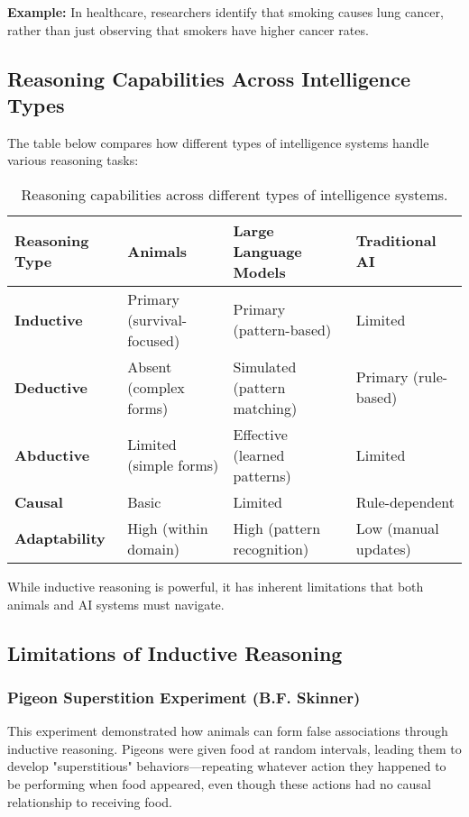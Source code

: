 \textbf{Example:} In healthcare, researchers identify that smoking causes lung cancer, rather than just observing that smokers have higher cancer rates.

\subsection{Reasoning Capabilities Across Intelligence Types}
The table below compares how different types of intelligence systems handle various reasoning tasks:

\begin{table}[h!]
\centering
\begin{tabular}{|l|l|l|l|}
\hline
\textbf{Reasoning Type} & \textbf{Animals} & \textbf{Large Language Models} & \textbf{Traditional AI} \\
\hline
\textbf{Inductive} & Primary (survival-focused) & Primary (pattern-based) & Limited \\
\hline
\textbf{Deductive} & Absent (complex forms) & Simulated (pattern matching) & Primary (rule-based) \\
\hline
\textbf{Abductive} & Limited (simple forms) & Effective (learned patterns) & Limited \\
\hline
\textbf{Causal} & Basic & Limited & Rule-dependent \\
\hline
\textbf{Adaptability} & High (within domain) & High (pattern recognition) & Low (manual updates) \\
\hline
\end{tabular}
\caption{Reasoning capabilities across different types of intelligence systems.}
\end{table}

While inductive reasoning is powerful, it has inherent limitations that both animals and AI systems must navigate.

\subsection{Limitations of Inductive Reasoning}

\subsubsection{Pigeon Superstition Experiment (B.F. Skinner)}
This experiment demonstrated how animals can form false associations through inductive reasoning. Pigeons were given food at random intervals, leading them to develop "superstitious" behaviors---repeating whatever action they happened to be performing when food appeared, even though these actions had no causal relationship to receiving food.

